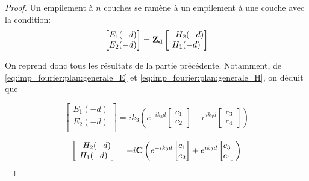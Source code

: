 \begin{proof}
    Un empilement à $n$ couches se ramène à un empilement à une couche avec la condition:
    \begin{equation}
        \begin{bmatrix}
            E_1(-d)\\
            E_2(-d)\\
        \end{bmatrix}
        =
        \mathbf{Z_{d}} 
        \begin{bmatrix}
            -H_2(-d)\\
            H_1(-d)\\
        \end{bmatrix}
    \end{equation}

    On reprend donc tous les résultats de la partie précédente. Notamment, de \eqref{eq:imp_fourier:plan:generale_E} et \eqref{eq:imp_fourier:plan:generale_H}, on déduit que

    \begin{equation}
        \begin{bmatrix}
            E_1(-d)\\
            E_2(-d)\\
        \end{bmatrix}
        = ik_3\left( e^{-ik_3 d}
        \begin{bmatrix}
            c_1 \\
            c_2
        \end{bmatrix}
        -e^{ik_3 d}
        \begin{bmatrix}
            c_3 \\
            c_4
        \end{bmatrix}
        \right)
    \end{equation}

    \begin{equation}
        \begin{bmatrix}
            -H_2(-d)\\
            H_1(-d)\\
        \end{bmatrix}
        =-i
        \mathbf{C}
        \left(
            e^{-ik_3 d}
            \begin{bmatrix}
                c_1 \\
                c_2
            \end{bmatrix}
            +e^{ik_3 d}
            \begin{bmatrix}
                c_3 \\
                c_4
            \end{bmatrix}
        \right)
    \end{equation}


\end{proof}
